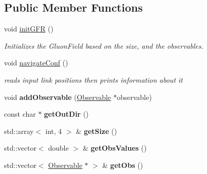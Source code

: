 \subsection*{Public Member Functions}
\begin{DoxyCompactItemize}
\item 
void \hyperlink{classGaugeFieldReader_aa4eac4656319ffb5d397dc6dd6b4f426}{init\+G\+FR} ()\hypertarget{classGaugeFieldReader_aa4eac4656319ffb5d397dc6dd6b4f426}{}\label{classGaugeFieldReader_aa4eac4656319ffb5d397dc6dd6b4f426}

\begin{DoxyCompactList}\small\item\em Initializes the Gluon\+Field based on the size, and the observables. \end{DoxyCompactList}\item 
void \hyperlink{classGaugeFieldReader_ae047fbcc24c34482d639028df877687a}{navigate\+Conf} ()\hypertarget{classGaugeFieldReader_ae047fbcc24c34482d639028df877687a}{}\label{classGaugeFieldReader_ae047fbcc24c34482d639028df877687a}

\begin{DoxyCompactList}\small\item\em reads input link positions then prints information about it \end{DoxyCompactList}\item 
void {\bfseries add\+Observable} (\hyperlink{classObservable}{Observable} $\ast$observable)\hypertarget{classGaugeFieldReader_af795e0891c276b0a6c8d8ade159df3b8}{}\label{classGaugeFieldReader_af795e0891c276b0a6c8d8ade159df3b8}

\item 
const char $\ast$ {\bfseries get\+Out\+Dir} ()\hypertarget{classGaugeFieldReader_a015c7811098f42d98b7a9d5f3b52d8b4}{}\label{classGaugeFieldReader_a015c7811098f42d98b7a9d5f3b52d8b4}

\item 
std\+::array$<$ int, 4 $>$ \& {\bfseries get\+Size} ()\hypertarget{classGaugeFieldReader_a2c7cc1114b6442acdb3112409e50792f}{}\label{classGaugeFieldReader_a2c7cc1114b6442acdb3112409e50792f}

\item 
std\+::vector$<$ double $>$ \& {\bfseries get\+Obs\+Values} ()\hypertarget{classGaugeFieldReader_a470083eb93cd916886d1ea68091ee728}{}\label{classGaugeFieldReader_a470083eb93cd916886d1ea68091ee728}

\item 
std\+::vector$<$ \hyperlink{classObservable}{Observable} $\ast$ $>$ \& {\bfseries get\+Obs} ()\hypertarget{classGaugeFieldReader_a3326dd6abb58a608a387e7e91a1ed0cc}{}\label{classGaugeFieldReader_a3326dd6abb58a608a387e7e91a1ed0cc}


\end{DoxyCompactItemize}
